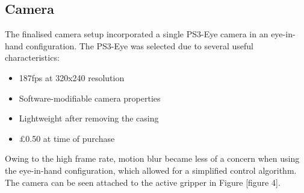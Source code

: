 \documentclass[conference]{IEEEtran}
\begin{document}
	\subsection{Camera}
	The finalised camera setup incorporated a single PS3-Eye camera in an eye-in-hand configuration. The PS3-Eye was selected due to several useful characteristics:
	\begin{itemize}
		\item 187fps at 320x240 resolution
		
		\item Software-modifiable camera properties
		
		\item Lightweight after removing the casing
		
		\item \pounds0.50 at time of purchase
	\end{itemize}
	
	Owing to the high frame rate, motion blur became less of a concern when using the eye-in-hand configuration, which allowed for a simplified control algorithm. The camera can be seen attached to the active gripper in Figure [figure 4].
	
\end{document}
